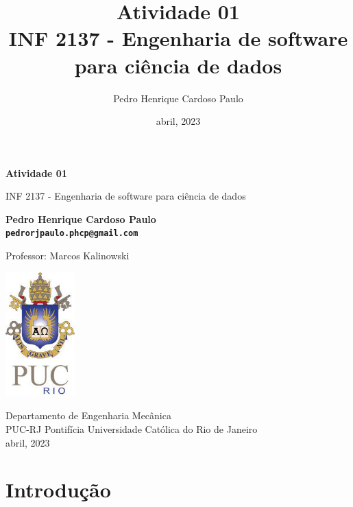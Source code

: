\documentclass[10pt, a4paper]{article}
\begin{document}
\def\TITLE{Atividade 01}
\def\DISCIPLINE{INF 2137 - Engenharia de software para ciência de dados}
\def\PROFESSOR{Marcos Kalinowski}
\def\AUTHOR{Pedro Henrique Cardoso Paulo}
\def\CONTACT{pedrorjpaulo.phcp@gmail.com}
\def\DATE{abril, 2023}

\title{\textbf{\TITLE} \\ \DISCIPLINE}
\author{\AUTHOR}
\date{\DATE}

\begin{titlepage}
      \begin{center}
          \vspace*{1cm}

          \Huge
          \textbf{\TITLE}

          \vspace{0.5cm}
          \LARGE
          \DISCIPLINE

          \vspace{1.5cm}

          \textbf{\AUTHOR \\ {\tt \CONTACT}}

          \vfill
          Professor: \PROFESSOR

          \vspace{0.8cm}

          \includegraphics[width=0.2\textwidth]{../general/puc.jpg}

          \Large
          Departamento de Engenharia Mecânica\\
          PUC-RJ Pontifícia Universidade Católica do Rio de Janeiro\\
          \DATE

      \end{center}
  \end{titlepage}

\maketitle

\section{Introdução}
\end{document}
